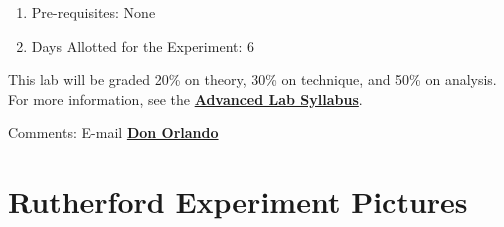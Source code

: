 \documentclass{../lab}
\begin{document}
\begin{enumerate}
    \item Pre-requisites: None

    \item Days Allotted for the Experiment: 6
\end{enumerate}

This lab will be graded 20\% on theory, 30\% on technique, and 50\% on analysis. For more information, see the \href{\AdvancedLabSyllabus}{\textbf{Advanced Lab Syllabus}}.

Comments: E-mail \href{\MailDonOrlando}{\textbf{Don Orlando}}

\section{Rutherford Experiment Pictures}
\end{document}
